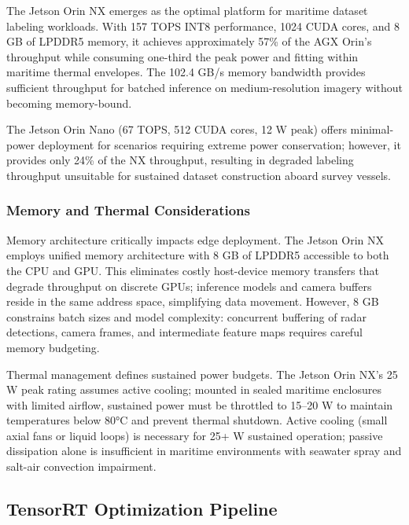 The Jetson Orin NX emerges as the optimal platform for maritime dataset labeling workloads. With 157 TOPS INT8 performance, 1024 CUDA cores, and 8 GB of LPDDR5 memory, it achieves approximately 57\% of the AGX Orin's throughput while consuming one-third the peak power and fitting within maritime thermal envelopes. The 102.4 GB/s memory bandwidth provides sufficient throughput for batched inference on medium-resolution imagery without becoming memory-bound. \cite{NVIDIA2024Benchmarks}

The Jetson Orin Nano (67 TOPS, 512 CUDA cores, 12 W peak) offers minimal-power deployment for scenarios requiring extreme power conservation; however, it provides only 24\% of the NX throughput, resulting in degraded labeling throughput unsuitable for sustained dataset construction aboard survey vessels.

\subsubsection{Memory and Thermal Considerations}

Memory architecture critically impacts edge deployment. The Jetson Orin NX employs unified memory architecture with 8 GB of LPDDR5 accessible to both the CPU and GPU. This eliminates costly host-device memory transfers that degrade throughput on discrete GPUs; inference models and camera buffers reside in the same address space, simplifying data movement. However, 8 GB constrains batch sizes and model complexity: concurrent buffering of radar detections, camera frames, and intermediate feature maps requires careful memory budgeting. \cite{Chen2023BenchmarkingDeepLearning}

Thermal management defines sustained power budgets. The Jetson Orin NX's 25 W peak rating assumes active cooling; mounted in sealed maritime enclosures with limited airflow, sustained power must be throttled to 15--20 W to maintain temperatures below 80°C and prevent thermal shutdown. Active cooling (small axial fans or liquid loops) is necessary for 25+ W sustained operation; passive dissipation alone is insufficient in maritime environments with seawater spray and salt-air convection impairment.



\subsection{TensorRT Optimization Pipeline}

